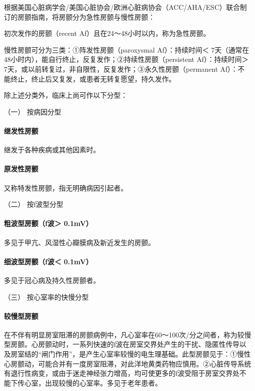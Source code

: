 根据美国心脏病学会/美国心脏协会/欧洲心脏病协会（ACC/AHA/ESC）联合制订的房颤指南，将房颤分为急性房颤与慢性房颤：

初次发作的房颤（recent Af）且在24～48小时以内，称为急性房颤。

慢性房颤可分为三类：①阵发性房颤（paroxysmal Af）：持续时间＜
7天（通常在48小时内），能自行终止，反复发作；②持续性房颤（persistent
Af）：持续时间＞
7天，或以前转复过，非自限性，反复发作；③永久性房颤（permanent
Af）：不能终止，终止后又复发，或患者无转复愿望，持久发作。

除上述分类外，临床上尚可作以下分型：

\hypertarget{text00291.htmlux5cux23CHP10-2-4-2-3-1}{}
（一） 按病因分型

\paragraph{继发性房颤}

继发于各种疾病或其他因素时。

\paragraph{原发性房颤}

又称特发性房颤，指无明确病因引起者。

\hypertarget{text00291.htmlux5cux23CHP10-2-4-2-3-2}{}
（二） 按f波型分型

\paragraph{粗波型房颤（f波＞ 0.1mV）}

多见于甲亢、风湿性心瓣膜病及新近发生的房颤。

\paragraph{细波型房颤（f波＜ 0.1mV）}

多见于冠心病及持久性房颤者。

\hypertarget{text00291.htmlux5cux23CHP10-2-4-2-3-3}{}
（三） 按心室率的快慢分型

\paragraph{较慢型房颤}

在不伴有明显房室阻滞的房颤病例中，凡心室率在60～100次/分之间者，称为较慢型房颤。心房颤动时，一系列快速的f波在房室交界处产生的干扰、隐匿性传导以及房室结的“闸门作用”，是产生心室率较慢的电生理基础。此型房颤见于：①慢性心房颤动，可能合并有一度房室阻滞，对此洋地黄类药物应慎用。②心脏传导系统有退行性病变，或由于迷走神经张力增高，均可使更多的f波受阻于房室交界处不能下传心室，出现较慢的心室率。多见于老年患者。

